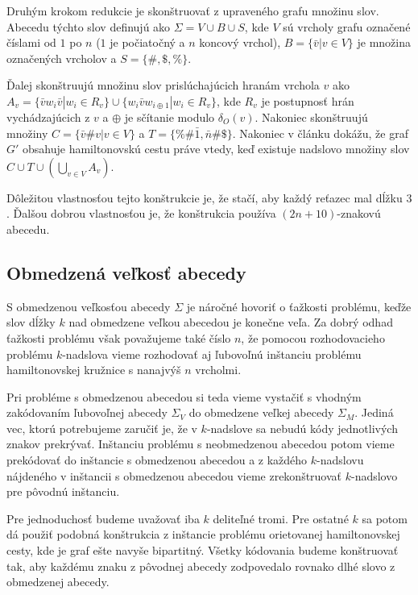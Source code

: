 Druhým krokom redukcie je skonštruovať z upraveného grafu množinu slov. Abecedu
týchto slov definujú ako $\Sigma = V \cup B \cup S$, kde $V$ sú vrcholy grafu označené
číslami od $1$ po $n$ ($1$ je počiatočný a $n$ koncový vrchol), $B = \{ \bar{v} | v \in V \}$
je množina označených vrcholov a $S = \{\#, \$, \% \}$.

Ďalej skonštruujú množinu slov prislúchajúcich hranám vrchola $v$ ako
$A_v = \{ \bar{v}w_i\bar{v} | w_i \in R_v\} \cup \{ w_i \bar{v} w_{i \oplus 1} | w_i \in R_v\}$,
kde $R_v$ je postupnosť hrán vychádzajúcich z $v$ a $\oplus$ je sčítanie modulo $\delta_O(v)$.
Nakoniec skonštruujú množiny $C = \{ \bar{v} \# v | v \in V\}$ a $T = \{ \% \# \bar{1}, \bar{n} \# \$\}$.
Nakoniec v článku dokážu, že graf $G'$ obsahuje hamiltonovskú cestu práve vtedy, keď
existuje nadslovo množiny slov $C \cup T \cup (\bigcup\limits_{v \in V} A_v)$.

Dôležitou vlastnosťou tejto konštrukcie je, že stačí, aby každý reťazec mal dĺžku $3$. Ďalšou dobrou
vlastnosťou je, že konštrukcia používa $(2n + 10)$-znakovú abecedu.

\subsection{Obmedzená veľkosť abecedy}

S obmedzenou veľkosťou abecedy $\Sigma$ je náročné hovoriť o ťažkosti problému, keďže
slov dĺžky $k$ nad obmedzene veľkou abecedou je konečne veľa. Za dobrý odhad
ťažkosti problému však považujeme také číslo $n$, že pomocou rozhodovacieho
problému $k$-nadslova vieme rozhodovať aj ľubovoľnú inštanciu problému
hamiltonovskej kružnice s nanajvýš $n$ vrcholmi.

Pri probléme s obmedzenou abecedou si teda vieme vystačiť s vhodným zakódovaním
ľubovoľnej abecedy $\Sigma_V$ do obmedzene veľkej abecedy $\Sigma_M$. Jediná vec, ktorú potrebujeme zaručiť
je, že v $k$-nadslove sa nebudú kódy jednotlivých znakov prekrývať. Inštanciu
problému s neobmedzenou abecedou potom vieme prekódovať do inštancie s obmedzenou
abecedou a z každého $k$-nadslovu nájdeného v inštancii s obmedzenou abecedou
vieme zrekonštruovať $k$-nadslovo pre pôvodnú inštanciu.

Pre jednoduchosť budeme uvažovať iba $k$ deliteľné tromi. Pre ostatné $k$ sa
potom dá použiť podobná konštrukcia z inštancie problému orietovanej hamiltonovskej cesty,
kde je graf ešte navyše bipartitný. Všetky kódovania budeme konštruovať tak, aby
každému znaku z pôvodnej abecedy zodpovedalo rovnako dlhé slovo z obmedzenej abecedy.

